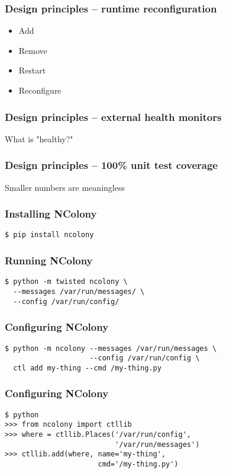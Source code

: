 \documentclass{beamer}
\begin{document}
\begin{frame}
\frametitle{Design principles -- runtime reconfiguration}
\begin{itemize}
\item Add
\item Remove
\item Restart
\item Reconfigure
\end{itemize}
\end{frame}

\begin{frame}
\frametitle{Design principles -- external health monitors}
What is "healthy?"
\end{frame}

\begin{frame}
\frametitle{Design principles -- 100\% unit test coverage}
Smaller numbers are meaningless
\end{frame}

\begin{frame}[fragile]
\frametitle{Installing NColony}
\begin{lstlisting}
$ pip install ncolony
\end{lstlisting}
\end{frame}

\begin{frame}[fragile]
\frametitle{Running NColony}
\begin{lstlisting}
$ python -m twisted ncolony \
  --messages /var/run/messages/ \
  --config /var/run/config/
\end{lstlisting}
\end{frame}

\begin{frame}[fragile]
\frametitle{Configuring NColony}
\begin{lstlisting}
$ python -m ncolony --messages /var/run/messages \
                    --config /var/run/config \
  ctl add my-thing --cmd /my-thing.py
\end{lstlisting}
\end{frame}

\begin{frame}[fragile]
\frametitle{Configuring NColony}
\begin{lstlisting}
$ python
>>> from ncolony import ctllib
>>> where = ctllib.Places('/var/run/config',
                          '/var/run/messages')
>>> ctllib.add(where, name='my-thing',
                      cmd='/my-thing.py')
\end{lstlisting}
\end{frame}
\end{document}

